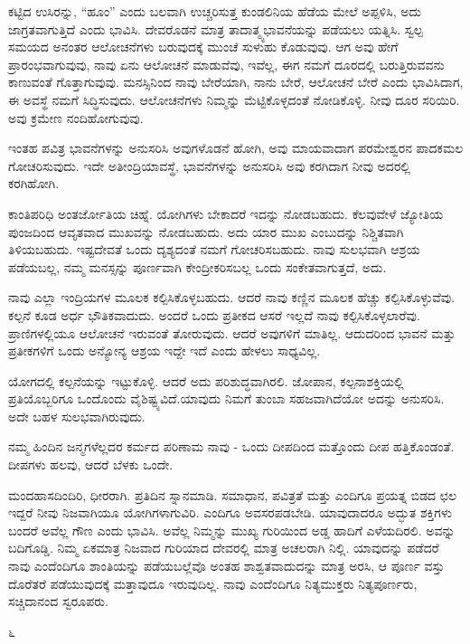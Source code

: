 ಕಟ್ಟಿದ ಉಸಿರನ್ನು, “ಹೂಂ” ಎಂದು ಬಲವಾಗಿ ಉಚ್ಚರಿಸುತ್ತ ಕುಂಡಲಿನಿಯ ಹೆಡೆಯ ಮೇಲೆ ಅಪ್ಪಳಿಸಿ, ಅದು ಜಾಗ್ರತವಾಗುತ್ತಿದೆ ಎಂದು ಭಾವಿಸಿ. ದೇವರೊಡನೆ ಮಾತ್ರ ತಾದಾತ್ಮ್ಯಭಾವನೆಯನ್ನು ಪಡೆಯಲು ಯತ್ನಿಸಿ. ಸ್ವಲ್ಪ ಸಮಯದ ಅನಂತರ ಆಲೋಚನೆಗಳು ಬರುವುದಕ್ಕೆ ಮುಂಚೆ ಸುಳುಹು ಕೊಡುವುವು. ಆಗ ಅವು ಹೇಗೆ ಪ್ರಾರಂಭವಾಗುವುವು, ನಾವು ಏನು ಆಲೋಚನೆ ಮಾಡುವೆವು, ಇವೆಲ್ಲ, ಈಗ ನಮಗೆ ದೂರದಲ್ಲಿ ಬರುತ್ತಿರುವವನು ಕಾಣುವಂತೆ ಗೊತ್ತಾಗುವುವು. ಮನಸ್ಸಿನಿಂದ ನಾವು ಬೇರೆಯಾಗಿ, ನಾನು ಬೇರೆ, ಆಲೋಚನೆ ಬೇರೆ ಎಂದು ಭಾವಿಸಿದಾಗ, ಈ ಅವಸ್ಥೆ ನಮಗೆ ಸಿದ್ಧಿಸುವುದು. ಆಲೋಚನೆಗಳು ನಿಮ್ಮನ್ನು ಮೆಟ್ಟಿಕೊಳ್ಳದಂತೆ ನೋಡಿಕೊಳ್ಳಿ. ನೀವು ದೂರ ಸರಿಯಿರಿ. ಅವು ಕ್ರಮೇಣ ನಂದಿಹೋಗುವುವು.

ಇಂತಹ ಪವಿತ್ರ ಭಾವನೆಗಳನ್ನು ಅನುಸರಿಸಿ ಅವುಗಳೊಡನೆ ಹೋಗಿ, ಅವು ಮಾಯವಾದಾಗ ಪರಮೇಶ್ವರನ ಪಾದಕಮಲ ಗೋಚರಿಸುವುದು. ಇದೇ ಅತೀಂದ್ರಿಯಾವಸ್ಥೆ, ಭಾವನೆಗಳನ್ನು ಅನುಸರಿಸಿ ಅವು ಕರಗಿದಾಗ ನೀವು ಅದರಲ್ಲಿ ಕರಗಿಹೋಗಿ.

ಕಾಂತಿಪರಿಧಿ ಅಂತರ್ಜೋತಿಯ ಚಿಹ್ನೆ. ಯೋಗಿಗಳು ಬೇಕಾದರೆ ಇದನ್ನು ನೋಡಬಹುದು. ಕೆಲವುವೇಳೆ ಜ್ಯೋತಿಯ ಪುಂಜದಿಂದ ಆವೃತವಾದ ಮುಖವನ್ನು ನೋಡಬಹುದು. ಅದು ಯಾರ ಮುಖ ಎಂಬುದನ್ನು ನಿಶ್ಚಿತವಾಗಿ ತಿಳಿಯಬಹುದು. ಇಷ್ಟದೇವತೆ ಒಂದು ದೃಶ್ಯದಂತೆ ನಮಗೆ ಗೋಚರಿಸಬಹುದು. ನಾವು ಸುಲಭವಾಗಿ ಆಶ್ರಯ ಪಡೆಯಬಲ್ಲ, ನಮ್ಮ ಮನಸ್ಸನ್ನು ಪೂರ್ಣವಾಗಿ ಕೇಂದ್ರೀಕರಿಸಬಲ್ಲ ಒಂದು ಸಂಕೇತವಾಗುತ್ತದೆ, ಅದು.

ನಾವು ಎಲ್ಲಾ ಇಂದ್ರಿಯಗಳ ಮೂಲಕ ಕಲ್ಪಿಸಿಕೊಳ್ಳಬಹುದು. ಆದರೆ ನಾವು ಕಣ್ಣಿನ ಮೂಲಕ ಹೆಚ್ಚು ಕಲ್ಪಿಸಿಕೊಳ್ಳುವೆವು. ಕಲ್ಪನೆ ಕೂಡ ಅರ್ಧ ಭೌತಿಕವಾದುದು. ಅಂದರೆ ಒಂದು ಪ್ರತೀಕದ ಆಸರೆ ಇಲ್ಲದೆ ನಾವು ಕಲ್ಪಿಸಿಕೊಳ್ಳಲಾರೆವು. ಪ್ರಾಣಿಗಳಲ್ಲಿಯೂ ಆಲೋಚನೆ ಇರುವಂತೆ ತೋರುವುದು. ಆದರೆ ಅವುಗಳಿಗೆ ಮಾತಿಲ್ಲ. ಆದುದರಿಂದ ಭಾವನೆ ಮತ್ತು ಪ್ರತೀಕಗಳಿಗೆ ಒಂದು ಅನ್ಯೋನ್ಯ ಆಶ್ರಯ ಇದ್ದೇ ಇದೆ ಎಂದು ಹೇಳಲು ಸಾಧ್ಯವಿಲ್ಲ.

ಯೋಗದಲ್ಲಿ ಕಲ್ಪನೆಯನ್ನು ಇಟ್ಟುಕೊಳ್ಳಿ. ಆದರೆ ಅದು ಪರಿಶುದ್ಧವಾಗಿರಲಿ. ಜೋಪಾನ, ಕಲ್ಪನಾಶಕ್ತಿಯಲ್ಲಿ ಪ್ರತಿಯೊಬ್ಬರಿಗೂ ಒಂದೊಂದು ವೈಶಿಷ್ಟ್ಯವಿದೆ.\break ಯಾವುದು ನಿಮಗೆ ತುಂಬಾ ಸಹಜವಾಗಿದೆಯೋ ಅದನ್ನು ಅನುಸರಿಸಿ. ಅದೇ ಬಹಳ ಸುಲಭವಾಗಿರುವುದು.

ನಮ್ಮ ಹಿಂದಿನ ಜನ್ಮಗಳೆಲ್ಲದರ ಕರ್ಮದ ಪರಿಣಾಮ ನಾವು - ಒಂದು ದೀಪದಿಂದ ಮತ್ತೊಂದು ದೀಪ ಹತ್ತಿಕೊಂಡಂತೆ. ದೀಪಗಳು ಹಲವು, ಆದರೆ ಬೆಳಕು ಒಂದೇ.

ಮಂದಹಾಸದಿಂದಿರಿ, ಧೀರರಾಗಿ. ಪ್ರತಿದಿನ ಸ್ನಾನಮಾಡಿ. ಸಮಾಧಾನ, ಪವಿತ್ರತೆ ಮತ್ತು ಎಂದಿಗೂ ಪ್ರಯತ್ನ ಬಿಡದ ಛಲ ಇದ್ದರೆ ನೀವು ನಿಜವಾಗಿಯೂ ಯೋಗಿಗಳಾಗುವಿರಿ. ಎಂದಿಗೂ ಅವಸರಪಡಬೇಡಿ. ಯಾವುದಾದರೂ ಅದ್ಭುತ ಶಕ್ತಿಗಳು ಬಂದರೆ ಅವೆಲ್ಲ ಗೌಣ ಎಂದು ಭಾವಿಸಿ. ಅವೆಲ್ಲ ನಿಮ್ಮನ್ನು ಮುಖ್ಯ ಗುರಿಯಿಂದ ಅಡ್ಡ ಹಾದಿಗೆ ಎಳೆಯದಿರಲಿ. ಅವನ್ನು ಬದಿಗೊಡ್ಡಿ. ನಿಮ್ಮ ಏಕಮಾತ್ರ ನಿಜವಾದ ಗುರಿಯಾದ ದೇವರಲ್ಲಿ ಮಾತ್ರ ಅಚಲರಾಗಿ ನಿಲ್ಲಿ. ಯಾವುದನ್ನು ಪಡೆದರೆ ನಾವು ಎಂದೆಂದಿಗೂ ಶಾಂತಿಯನ್ನು ಪಡೆಯಬಲ್ಲೆವೊ ಅಂತಹ ಶಾಶ್ವತವಾದುದನ್ನು ಮಾತ್ರ ಅರಸಿ, ಆ ಪೂರ್ಣ ವಸ್ತು ದೊರೆತರೆ ಪಡೆಯುವುದಕ್ಕೆ ಮತ್ತಾವುದೂ ಇರುವುದಿಲ್ಲ. ನಾವು ಎಂದೆಂದಿಗೂ ನಿತ್ಯಮುಕ್ತರು ನಿತ್ಯಪೂರ್ಣರು, ಸಚ್ಚಿದಾನಂದ ಸ್ವರೂಪರು.

\begin{center}
೬
\end{center}

